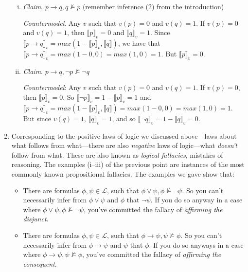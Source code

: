 \begin{enumerate}[\thesection.1]
\begin{enumerate}[(i)]
			\item \emph{Claim}. $p\to q, q\nvDash p$  (remember inference (2) from
				the introduction)
			
			\emph{Countermodel}. Any $v$ such that $v(p)=0$ and $v(q)=1$. If $v(p)=0$
			and $v(q)=1$, then $\llbracket p\rrbracket_v=0$ and $\llbracket
			q\rrbracket_v=1$. Since $\llbracket p\to q\rrbracket_v=max(1-\llbracket
			p\rrbracket_v, \llbracket q\rrbracket)$, we have that $\llbracket p\to
			q\rrbracket_v=max(1-0,0)=max(1,0)=1$. But $\llbracket p\rrbracket_v=0$.
		
			\item \emph{Claim}. $p\to q, \neg p\nvDash \neg q$
			
			\emph{Countermodel}: Any $v$ such that $v(p)=0$ and $v(q)=1$. If
			$v(p)=0$, then $\llbracket p\rrbracket_v=0$. So $\llbracket \neg
			p\rrbracket_v=1-\llbracket p\rrbracket_v=1$ and $\llbracket p\to
			q\rrbracket_v=max(1-\llbracket p\rrbracket_v, \llbracket
			q\rrbracket)=max(1-0, 0)=max(1,0)=1$. But since $v(q)=1$, $\llbracket
			q\rrbracket_v=1$, and so  $\llbracket \neg q\rrbracket_v=1-\llbracket
			q\rrbracket_v=0$.
			
		\end{enumerate}
		
		\item Corresponding to the positive laws of logic we discussed above---laws about what follows from what---there are also \emph{negative} laws of logic---what \emph{doesn't} follow from what. These are also known as \emph{logical fallacies}, mistakes of reasoning. The examples (i--iii) of the previous point are instances of the most commonly known propositional fallacies. The examples we gave show that:
		
		\begin{itemize}
		
			\item There are formulas $\phi,\psi\in\mathcal{L}$, such that $\phi\lor\psi,\phi\nvDash\neg\psi$. So you can't necessarily infer from $\phi\lor\psi$ and $\phi$ that $\neg\psi$. If you do so anyway in a case where $\phi\lor\psi,\phi\nvDash\neg\psi$, you've committed the fallacy of \emph{affirming the disjunct}.
			
			\item There are formulas $\phi,\psi\in\mathcal{L}$, such that $\phi\to\psi,\psi\nvDash\phi$. So you can't necessarily infer from $\phi\to\psi$ and $\psi$ that $\phi$. If you do so anyways in a case where $\phi\to\psi,\psi\nvDash\phi$, you've committed the fallacy of \emph{affirming the consequent}.
			

\end{itemize}
\end{enumerate}

